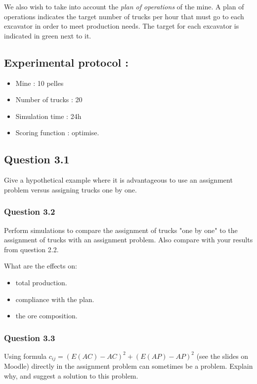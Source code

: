 \documentclass[letterpaper,12pt]{article}
\begin{document}
	We also wish to take into account the \textit{plan of operations} of the mine. A plan of operations indicates the target number of trucks per hour that must go to each excavator in order to meet production needs. The target for each excavator is indicated in green next to it.
	
	\subsection*{Experimental protocol : }
	
	\begin{itemize}
		\item Mine : 10 pelles
		\item Number of trucks : 20
		\item Simulation time : 24h
		\item Scoring function : optimise.
	\end{itemize}
	
	
	
	\subsection*{Question 3.1}
	
	Give a hypothetical example where it is advantageous to use an assignment problem versus assigning trucks one by one.
	
	\subsubsection*{Question 3.2} 
	
	Perform simulations to compare the assignment of trucks "one by one" to the assignment of trucks with an assignment problem. Also compare with your results from question 2.2.
	
	What are the effects on: 

	\begin{itemize}
		\item total production.
		\item compliance with the plan.
		\item the ore composition.
	\end{itemize}
	
	\subsubsection*{Question 3.3}
	
	Using formula $c_{ij} = \left(E(AC)-AC\right)^2 + \left(E(AP)-AP\right)^2$ (see the slides on Moodle) directly in the assignment problem can sometimes be a problem. Explain why, and suggest a solution to this problem.
\end{document}
